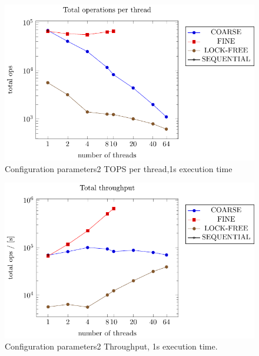 \documentclass{article}
\begin{document}
    \begin{figure}[H]
        \centering
        \includegraphics{../plots/parameters2_1s_per_thread.pdf}
        \caption{Configuration parameters2 TOPS per thread,1s execution time}
       
        \label{fig:parameters2_1s_per_thread}
    \end{figure}

    \begin{figure}[H]
        \centering
        \includegraphics{../plots/parameters2_1s_throughput.pdf}
        \caption{Configuration parameters2 Throughput, 1s execution time.}
        \label{fig:larameters1_1s_throughput}
    \end{figure}
\end{document}
